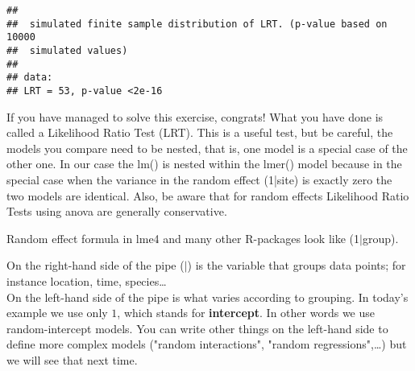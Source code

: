 \documentclass[12pt,a4paper]{scrartcl}\usepackage[]{graphicx}\usepackage[]{color}
\makeatletter
\newenvironment{kframe}{%
 \def\at@end@of@kframe{}%
 \ifinner\ifhmode%
  \def\at@end@of@kframe{\end{minipage}}%
  \begin{minipage}{\columnwidth}%
 \fi\fi%
 \def\FrameCommand##1{\hskip\@totalleftmargin \hskip-\fboxsep
 \colorbox{shadecolor}{##1}\hskip-\fboxsep
     \hskip-\linewidth \hskip-\@totalleftmargin \hskip\columnwidth}%
 \MakeFramed {\advance\hsize-\width
   \@totalleftmargin\z@ \linewidth\hsize
   \@setminipage}}%
 {\par\unskip\endMakeFramed%
 \at@end@of@kframe}
\newenvironment{knitrout}{}{} %
\makeatother
\begin{document}
\begin{Answer}
\begin{knitrout}
\begin{kframe}
{\ttfamily\noindent\itshape\color{messagecolor}{\#\# No restrictions on fixed effects. REML-based inference preferable.}}

{\ttfamily\noindent\itshape\color{messagecolor}{\#\# Using likelihood evaluated at REML estimators.}}

{\ttfamily\noindent\itshape{}}\begin{verbatim}
## 
## 	simulated finite sample distribution of LRT. (p-value based on 10000
## 	simulated values)
## 
## data:  
## LRT = 53, p-value <2e-16
\end{verbatim}
\end{kframe}
\end{knitrout}

\end{Answer}
If you have managed to solve this exercise, congrats! What you have done is called a Likelihood Ratio Test (LRT). This is a useful test, but be careful, the models you compare need to be nested, that is, one model is a special case of the other one. In our case the lm() is nested within the lmer() model because in the special case when the variance in the random effect (1|site) is exactly zero the two models are identical.
Also, be aware that for random effects Likelihood Ratio Tests using anova are generally conservative.



\begin{tcolorbox}[colback=green!5,colframe=green!40!black,title=How does random effect formula work again?]
Random effect formula in lme4 and many other R-packages look like (1$|$group).

On the right-hand side of the pipe ($|$) is the variable that groups data points; for instance location, time, species\dots \\

On the left-hand side of the pipe is what varies according to grouping. In today's example we use only $1$, which stands for \textbf{intercept}. In other words we use random-intercept models. You can write other things on the left-hand side to define more complex models ("random interactions", "random regressions",\dots) but we will see that next time.

\end{tcolorbox}




\section{}
\end{document}
